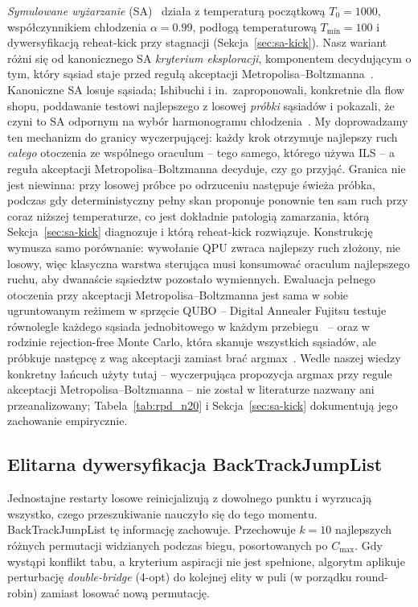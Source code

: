 \documentclass[11pt,a4paper]{article}
\begin{document}
\emph{Symulowane wyżarzanie} (SA)~\citep{kirkpatrick1983} działa
z temperaturą początkową $T_0=1000$, współczynnikiem chłodzenia
$\alpha=0.99$, podłogą temperaturową $T_{\min}=100$ i dywersyfikacją
reheat-kick przy stagnacji (Sekcja~\ref{sec:sa-kick}). Nasz wariant
różni się od kanonicznego SA \emph{kryterium eksploracji}, komponentem
decydującym o tym, który sąsiad staje przed regułą akceptacji
Metropolisa--Boltzmanna~\citep{franzin19}. Kanoniczne SA losuje sąsiada; Ishibuchi
i in.\ zaproponowali, konkretnie dla flow shopu, poddawanie testowi
najlepszego z losowej \emph{próbki} sąsiadów i pokazali, że czyni to SA
odpornym na wybór harmonogramu chłodzenia~\citep{ishibuchi95}. My
doprowadzamy ten mechanizm do granicy wyczerpującej: każdy krok
otrzymuje najlepszy ruch \emph{całego} otoczenia ze wspólnego oraculum
-- tego samego, którego używa ILS -- a reguła akceptacji Metropolisa--Boltzmanna decyduje,
czy go przyjąć. Granica nie jest niewinna: przy losowej próbce po
odrzuceniu następuje świeża próbka, podczas gdy deterministyczny pełny
skan proponuje ponownie ten sam ruch przy coraz niższej temperaturze,
co jest dokładnie patologią zamarzania, którą
Sekcja~\ref{sec:sa-kick} diagnozuje i którą reheat-kick rozwiązuje.
Konstrukcję wymusza samo porównanie: wywołanie QPU zwraca najlepszy ruch
złożony, nie losowy, więc klasyczna warstwa sterująca musi konsumować
oraculum najlepszego ruchu, aby dwanaście sąsiedztw pozostało
wymiennych. Ewaluacja pełnego otoczenia przy akceptacji Metropolisa--Boltzmanna
jest sama w sobie ugruntowanym reżimem w sprzęcie QUBO -- Digital
Annealer Fujitsu testuje równolegle każdego sąsiada jednobitowego
w każdym przebiegu~\citep{aramon19} -- oraz w rodzinie rejection-free
Monte Carlo, która skanuje wszystkich sąsiadów, ale próbkuje następcę
z wag akceptacji zamiast brać argmax~\citep{rosenthal21}. Wedle naszej
wiedzy konkretny łańcuch użyty tutaj -- wyczerpująca propozycja argmax
przy regule akceptacji Metropolisa--Boltzmanna -- nie został w literaturze nazwany ani
przeanalizowany; Tabela~\ref{tab:rpd_n20}
i Sekcja~\ref{sec:sa-kick} dokumentują jego zachowanie empirycznie.

\subsection{Elitarna dywersyfikacja BackTrackJumpList}
\label{sec:btjl}

Jednostajne restarty losowe reinicjalizują z dowolnego punktu
i wyrzucają wszystko, czego przeszukiwanie nauczyło się do tego momentu.
BackTrackJumpList tę informację zachowuje. Przechowuje $k=10$
najlepszych różnych permutacji widzianych podczas biegu, posortowanych
po $C_{\max}$. Gdy wystąpi konflikt tabu, a kryterium aspiracji nie
jest spełnione, algorytm aplikuje perturbację \emph{double-bridge}
(4-opt) do kolejnej elity w puli (w porządku round-robin) zamiast
losować nową permutację.
\end{document}
